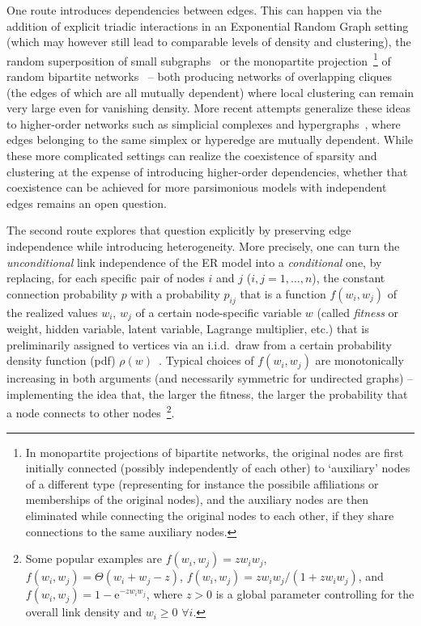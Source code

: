 \documentclass[ twocolumn,
 amsmath,amssymb,
 aps, pre, amsthm, amsfonts,
]{revtex4-2}
\newcommand{\e}{\mathrm{e}}
\begin{document}
One route introduces dependencies between edges. This can happen via the addition of explicit triadic interactions in an Exponential Random Graph setting~\cite{newman2003properties,newman2009random} (which may however still lead to comparable levels of density and clustering), the random superposition of small subgraphs~\cite{bollobas2011sparse} or the monopartite projection~\footnote{In monopartite projections of bipartite networks, the original nodes are first initially connected (possibly independently of each other) to `auxiliary’ nodes of a different type (representing for instance the possibile affiliations or memberships of the original nodes), and the auxiliary nodes are then eliminated while connecting the original nodes to each other, if they share connections to the same auxiliary nodes.} of random bipartite networks~\cite{newman2003social} -- both producing networks of overlapping cliques (the edges of which are all mutually dependent) where local clustering can remain very large even for vanishing density. 
More recent attempts generalize these ideas to higher-order networks such as simplicial complexes and hypergraphs~\cite{battiston2022higher,boccaletti2023structure}, where edges belonging to the same simplex or hyperedge are mutually dependent. 
While these more complicated settings can realize the coexistence of sparsity and clustering at the expense of introducing higher-order dependencies, whether that coexistence can be achieved for more parsimonious models with independent edges remains an open question.

The second route explores that question explicitly by preserving edge independence while introducing heterogeneity. 
More precisely, one can turn the \emph{unconditional} link independence of the ER model into a \emph{conditional} one, by replacing, for each specific pair of nodes $i$ and $j$ ($i,j=1,\dots,n$), the constant connection probability $p$ with a probability $p_{ij}$ that is a function $f(w_i,w_j)$ of the realized values $w_i$, $w_j$ of a certain node-specific variable $w$ (called \emph{fitness} or weight, hidden variable, latent variable, Lagrange multiplier, etc.) that is preliminarily assigned to vertices via an i.i.d.\ draw from a certain probability density function (pdf) $\rho(w)$~\cite{caldarelli2002scale,van2016random, boguna2003class,squartini2017maximum}.
Typical choices of $f(w_i,w_j)$ are monotonically increasing in both arguments (and necessarily symmetric for undirected graphs) -- implementing the idea that, the larger the fitness, the larger the probability that a node connects to other nodes~\footnote{Some popular examples are  $f(w_i,w_j)=zw_i w_j$, $f(w_i,w_j)=\Theta(w_i+w_j-z)$, $f(w_i,w_j)=zw_i w_j/(1+zw_i w_j)$, and $f(w_i,w_j)=1-\e^{-zw_i w_j}$, where $z>0$ is a global parameter controlling for the overall link density and $w_i\ge0$ $\forall i$.}.
\end{document}
